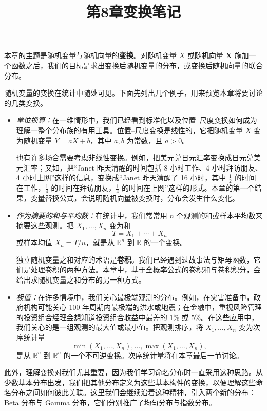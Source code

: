 \documentclass[UTF8,12pt,a4paper,fontset=fandol]{ctexart}
\title{第8章\quad 变换笔记}
\author{}
\date{}
\begin{document}
\maketitle

本章的主题是随机变量与随机向量的\textbf{变换}。对随机变量 $X$ 或随机向量 $\mathbf X$ 施加一个函数之后，我们的目标是求出变换后随机变量的分布，或变换后随机向量的联合分布。

随机变量的变换在统计中随处可见。下面先列出几个例子，用来预览本章将要讨论的几类变换。

\begin{itemize}
  \item \textit{单位换算：}在一维情形中，我们已经看到标准化以及位置--尺度变换如何成为理解一整个分布族的有用工具。位置--尺度变换是线性的，它把随机变量 $X$ 变为随机变量 $Y=aX+b$，其中 $a,b$ 为常数，且 $a>0$。

  也有许多场合需要考虑非线性变换。例如，把美元兑日元汇率变换成日元兑美元汇率；又如，把“Janet 昨天清醒的时间包括 8 小时工作、4 小时拜访朋友、4 小时上网”这样的信息，变换成“Janet 昨天清醒了 16 小时，其中 $\frac12$ 的时间在工作，$\frac14$ 的时间在拜访朋友，$\frac14$ 的时间在上网”这样的形式。本章的第一个结果，变量替换公式，会说明随机向量被变换时，分布会发生什么变化。

  \item \textit{作为摘要的和与平均数：}在统计中，我们常常用 $n$ 个观测的和或样本平均数来摘要这些观测。把 $X_1,\ldots,X_n$ 变为和
  \[
    T=X_1+\cdots+X_n
  \]
  或样本均值 $\bar X_n=T/n$，就是从 $\mathbb R^n$ 到 $\mathbb R$ 的一个变换。

  独立随机变量之和对应的术语是\textbf{卷积}。我们已经遇到过故事法与矩母函数，它们是处理卷积的两种方法。本章中，基于全概率公式的卷积和与卷积积分，会给出求随机变量之和分布的另一种方式。

  \item \textit{极值：}在许多情境中，我们关心最极端观测的分布。例如，在灾害准备中，政府机构可能关心 100 年周期内最极端的洪水或地震；在金融中，重视风险管理的投资组合经理会想知道投资组合收益中最差的 $1\%$ 或 $5\%$。在这些应用中，我们关心的是一组观测的最大值或最小值。把观测排序，将 $X_1,\ldots,X_n$ 变为次序统计量
  \[
    \min(X_1,\ldots,X_n),\ldots,\max(X_1,\ldots,X_n),
  \]
  是从 $\mathbb R^n$ 到 $\mathbb R^n$ 的一个不可逆变换。次序统计量将在本章最后一节讨论。
\end{itemize}

此外，理解变换对我们尤其重要，因为我们学习命名分布时一直采用这种思路。从少数基本分布出发，我们把其他分布定义为这些基本构件的变换，以便理解这些命名分布之间如何彼此关联。这里我们会继续沿着这种精神，引入两个新的分布：Beta 分布与 Gamma 分布，它们分别推广了均匀分布与指数分布。
\end{document}
